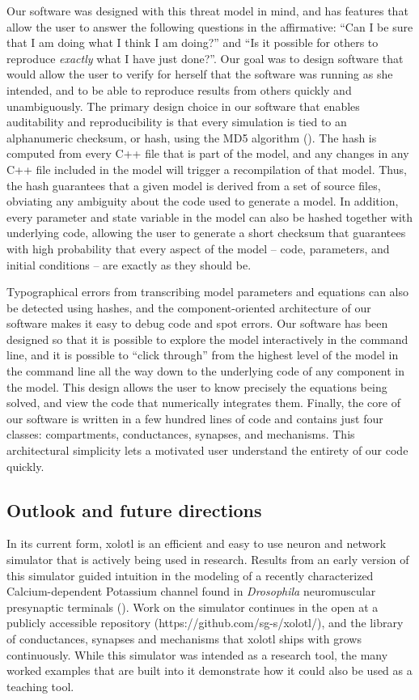 \documentclass{frontiersSCNS} %
\begin{document}
Our software was designed with this threat model in mind, and has features that allow the user to answer the following questions in the affirmative: ``Can I be sure that I am doing what I think I am doing?'' and ``Is it possible for others to reproduce {\em exactly} what I have just done?''. Our goal was to design software that would allow the user to verify for herself that the software was running as she intended, and to be able to reproduce results from others quickly and unambiguously. The primary design choice in our software that enables auditability and reproducibility is that every simulation is tied to an alphanumeric checksum, or hash, using the MD5 algorithm (\cite{rivestMD5MessageDigestAlgorithm1992}). The hash is computed from every C++ file that is part of the model, and any changes in any C++ file included in the model will trigger a recompilation of that model. Thus, the hash guarantees that a given model is derived from a set of source files, obviating any ambiguity about the code used to generate a model. In addition, every parameter and state variable in the model can also be hashed together with underlying code, allowing the user to generate a short checksum that guarantees with high probability that every aspect of the model -- code, parameters, and initial conditions -- are exactly as they should be.

Typographical errors from transcribing model parameters and equations can also be detected using hashes, and the component-oriented architecture of our software makes it easy to debug code and spot errors. Our software has been designed so that it is possible to explore the model interactively in the command line, and it is possible to ``click through'' from the highest level of the model in the command line all the way down to the underlying code of any component in the model. This design allows the user to know precisely the equations being solved, and view the code that numerically integrates them. Finally, the core of our software is written in a few hundred lines of code and contains just four classes: compartments, conductances, synapses, and mechanisms. This architectural simplicity lets a motivated user understand the entirety of our code quickly. 

\subsection{Outlook and future directions}

In its current form, xolotl is an efficient and easy to use neuron and network simulator that is actively being used in research. 
Results from an early version of this simulator guided intuition in the modeling of a recently characterized Calcium-dependent Potassium channel found in {\em Drosophila} neuromuscular presynaptic terminals (\cite{bronk2018regulation}). Work on the simulator continues in the open at a publicly accessible repository (https://github.com/sg-s/xolotl/), and the library of conductances, synapses and mechanisms that xolotl ships with grows continuously. While this simulator was intended as a research tool, the many worked examples that are built into it demonstrate how it could also be used as a teaching tool. 
\end{document}
